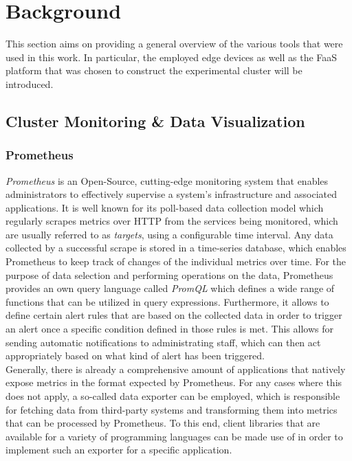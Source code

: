 \chapter{Background}\label{chapter:background}

This section aims on providing a general overview of the various tools that were used in this work. In particular, the employed edge devices as well as the FaaS platform that was chosen to construct the experimental cluster will be introduced.

\section{Cluster Monitoring \& Data Visualization}
\subsection{Prometheus}
\textit{Prometheus} is an Open-Source, cutting-edge monitoring system that enables administrators to effectively supervise a system's infrastructure and associated applications. It is well known for its poll-based data collection model which regularly scrapes metrics over HTTP from the services being monitored, which are usually referred to as \textit{targets}, using a configurable time interval. Any data collected by a successful scrape is stored in a time-series database, which enables Prometheus to keep track of changes of the individual metrics over time. For the purpose of data selection and performing operations on the data, Prometheus provides an own query language called \textit{PromQL} which defines a wide range of functions that can be utilized in query expressions. Furthermore, it allows to define certain alert rules that are based on the collected data in order to trigger an alert once a specific condition defined in those rules is met. This allows for sending automatic notifications to administrating staff, which can then act appropriately based on what kind of alert has been triggered.\\
Generally, there is already a comprehensive amount of applications that natively expose metrics in the format expected by Prometheus. For any cases where this does not apply, a so-called data exporter can be employed, which is responsible for fetching data from third-party systems and transforming them into metrics that can be processed by Prometheus. To this end, client libraries that are available for a variety of programming languages can be made use of in order to implement such an exporter for a specific application.

